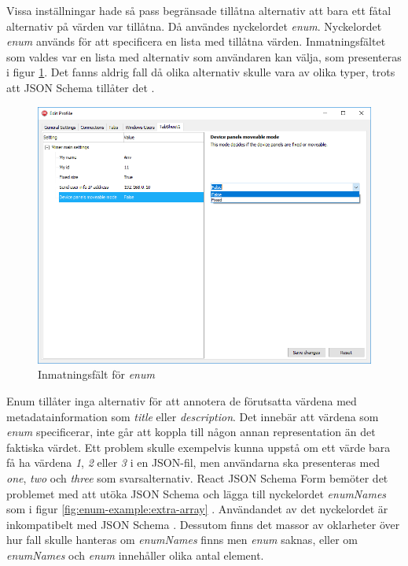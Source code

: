 Vissa inställningar hade så pass begränsade tillåtna alternativ att bara ett fåtal alternativ på värden var tillåtna. Då användes nyckelordet \textit{enum}. Nyckelordet \textit{enum} används för att specificera en lista med tillåtna värden. Inmatningsfältet som valdes var en lista med alternativ som användaren kan välja, som presenteras i figur \ref{fig:enum}. Det fanns aldrig fall då olika alternativ skulle vara av olika typer, trots att JSON Schema tillåter det \cite{Andrews2018}.

\begin{figure}
	\includegraphics[width=\textwidth]{./images/gui/enum.png}
	\vspace{-1.7em}
	\caption{Inmatningsfält för \textit{enum}}
	\label{fig:enum}
\end{figure}

Enum tillåter inga alternativ för att annotera de förutsatta värdena med metadatainformation som \textit{title} eller \textit{description}. Det innebär att värdena som \textit{enum} specificerar, inte går att koppla till någon annan representation än det faktiska värdet. Ett problem skulle exempelvis kunna uppstå om ett värde bara få ha värdena \textit{1}, \textit{2} eller \textit{3} i en JSON-fil, men användarna ska presenteras med \textit{one}, \textit{two} och \textit{three} som svarsalternativ. React JSON Schema Form bemöter det problemet med att utöka JSON Schema och lägga till nyckelordet \textit{enumNames} som i figur \ref{fig:enum-example:extra-array} \cite{MozillaServices}. Användandet av det nyckelordet är inkompatibelt med JSON Schema \cite{Andrews2018}. Dessutom finns det massor av oklarheter över hur fall skulle hanteras om \textit{enumNames} finns men \textit{enum} saknas, eller om \textit{enumNames} och \textit{enum} innehåller olika antal element.

